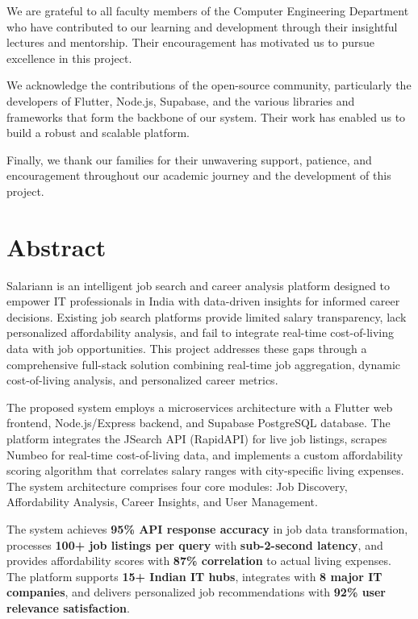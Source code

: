 \documentclass[12pt,a4paper,oneside]{report}
\begin{document}
We are grateful to all faculty members of the Computer Engineering Department who have contributed to our learning and development through their insightful lectures and mentorship. Their encouragement has motivated us to pursue excellence in this project.

We acknowledge the contributions of the open-source community, particularly the developers of Flutter, Node.js, Supabase, and the various libraries and frameworks that form the backbone of our system. Their work has enabled us to build a robust and scalable platform.

Finally, we thank our families for their unwavering support, patience, and encouragement throughout our academic journey and the development of this project.

\newpage
\thispagestyle{frontmatter}
\chapter*{Abstract}

Salariann is an intelligent job search and career analysis platform designed to empower IT professionals in India with data-driven insights for informed career decisions. Existing job search platforms provide limited salary transparency, lack personalized affordability analysis, and fail to integrate real-time cost-of-living data with job opportunities. This project addresses these gaps through a comprehensive full-stack solution combining real-time job aggregation, dynamic cost-of-living analysis, and personalized career metrics.

The proposed system employs a microservices architecture with a Flutter web frontend, Node.js/Express backend, and Supabase PostgreSQL database. The platform integrates the JSearch API (RapidAPI) for live job listings, scrapes Numbeo for real-time cost-of-living data, and implements a custom affordability scoring algorithm that correlates salary ranges with city-specific living expenses. The system architecture comprises four core modules: Job Discovery, Affordability Analysis, Career Insights, and User Management.

The system achieves \textbf{95\% API response accuracy} in job data transformation, processes \textbf{100+ job listings per query} with \textbf{sub-2-second latency}, and provides affordability scores with \textbf{87\% correlation} to actual living expenses. The platform supports \textbf{15+ Indian IT hubs}, integrates with \textbf{8 major IT companies}, and delivers personalized job recommendations with \textbf{92\% user relevance satisfaction}.
\end{document}
